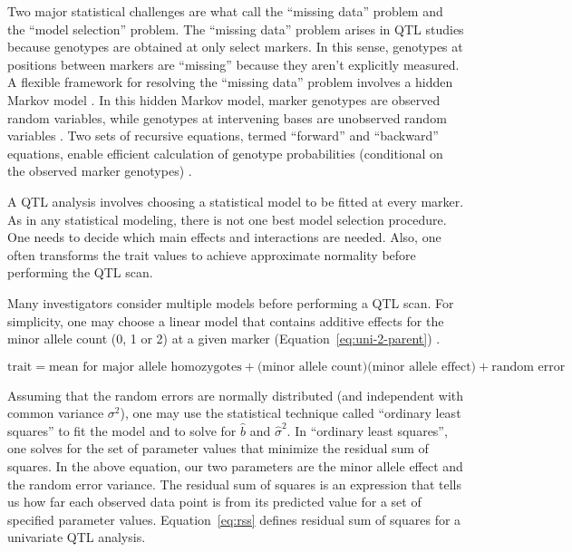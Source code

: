 \documentclass[]{article}\usepackage[]{graphicx}\usepackage[]{color}
\begin{document}
Two major statistical challenges are what \citet{broman2009guide} call 
the ``missing data'' problem and the ``model selection'' problem. 
The ``missing data'' problem arises in QTL studies because genotypes are obtained
at only select markers. In this sense, genotypes at positions between
markers are ``missing'' because they aren't explicitly measured. 
A flexible framework for resolving the ``missing data'' problem involves a
hidden Markov model \citep{broman2009guide, broman2006use}. 
In this hidden Markov model, marker genotypes are observed random variables, 
while genotypes at intervening bases are unobserved random variables \citep{broman2009guide,broman2006use}. 
Two sets of recursive equations, termed ``forward'' and ``backward'' equations,
enable efficient calculation of genotype probabilities
(conditional on the observed marker genotypes) \citep{baum1970maximization}.


A QTL analysis involves choosing a statistical model to be fitted at every marker. 
As in any statistical modeling, there is not one best model selection procedure.
One needs to decide which main effects and interactions are needed.
Also, one often transforms the trait values to achieve approximate normality before performing the QTL scan. 

Many investigators consider multiple models before performing a QTL scan.
For simplicity, one may choose a linear model that contains additive effects for
the  minor allele count (0, 1 or 2) at a given marker (Equation~\ref{eq:uni-2-parent}) \citep{martinez1992estimating,haley1992simple}.

\begin{equation}
\text{trait} = \text{mean for major allele homozygotes} + \text{(minor allele count)}\text{(minor allele effect)} + \text{random error}
\label{eq:uni-2-parent}
\end{equation}

Assuming that the random errors are normally distributed (and independent with common
variance $\sigma^2$), one may use the statistical technique called ``ordinary least squares''
to fit the model and to solve for $\hat b$ and $\hat \sigma^2$.
In ``ordinary least squares'', one solves for the set of parameter values that
minimize the residual sum of squares. In the above equation, our two parameters are the minor allele effect and the random error variance. The residual sum of squares is an expression that tells us how far each observed data point is from its predicted value for a set of specified parameter values. Equation~\ref{eq:rss} defines residual sum of squares for a univariate QTL analysis.
\end{document}
